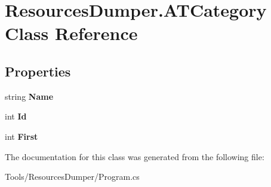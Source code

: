\hypertarget{class_resources_dumper_1_1_a_t_category}{\section{Resources\-Dumper.\-A\-T\-Category Class Reference}
\label{class_resources_dumper_1_1_a_t_category}
}
\subsection*{Properties}
\begin{DoxyCompactItemize}
\item 
\hypertarget{class_resources_dumper_1_1_a_t_category_a27590c85754be1ae11670e40c06d0e8b}{string {\bfseries Name}}\label{class_resources_dumper_1_1_a_t_category_a27590c85754be1ae11670e40c06d0e8b}

\item 
\hypertarget{class_resources_dumper_1_1_a_t_category_a3859c50d5e15971502cdce9849bf4d9f}{int {\bfseries Id}}\label{class_resources_dumper_1_1_a_t_category_a3859c50d5e15971502cdce9849bf4d9f}

\item 
\hypertarget{class_resources_dumper_1_1_a_t_category_ad5aee8101b4d1123cd880aa5ca737181}{int {\bfseries First}}\label{class_resources_dumper_1_1_a_t_category_ad5aee8101b4d1123cd880aa5ca737181}

\end{DoxyCompactItemize}


The documentation for this class was generated from the following file\-:\begin{DoxyCompactItemize}
\item 
Tools/\-Resources\-Dumper/Program.\-cs\end{DoxyCompactItemize}
